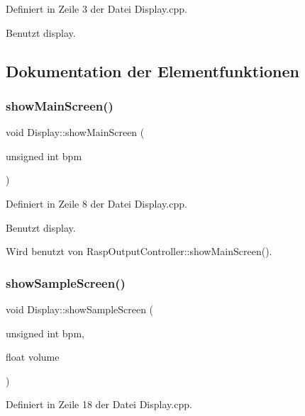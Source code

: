 Definiert in Zeile 3 der Datei Display.\+cpp.



Benutzt display.



\subsection{Dokumentation der Elementfunktionen}
\mbox{\label{class_display_a1a47a3c1e96d0ade385063c87197182f}} 
\subsubsection{\texorpdfstring{show\+Main\+Screen()}{showMainScreen()}}
{\footnotesize\ttfamily void Display\+::show\+Main\+Screen (\begin{DoxyParamCaption}\item[{unsigned int}]{bpm }\end{DoxyParamCaption})}



Definiert in Zeile 8 der Datei Display.\+cpp.



Benutzt display.



Wird benutzt von Rasp\+Output\+Controller\+::show\+Main\+Screen().

\mbox{\label{class_display_a74eafd254fbd1f6757ea77501b2b4d04}} 
\subsubsection{\texorpdfstring{show\+Sample\+Screen()}{showSampleScreen()}}
{\footnotesize\ttfamily void Display\+::show\+Sample\+Screen (\begin{DoxyParamCaption}\item[{unsigned int}]{bpm,  }\item[{float}]{volume }\end{DoxyParamCaption})}



Definiert in Zeile 18 der Datei Display.\+cpp.



